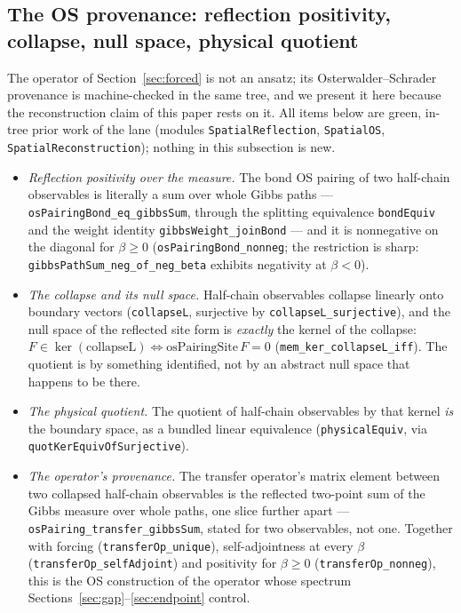 \documentclass[11pt]{article}
\newcommand{\lean}[1]{\texttt{#1}}
\begin{document}
\subsection{The OS provenance: reflection positivity, collapse, null
space, physical quotient}\label{sec:provenance}
The operator of Section~\ref{sec:forced} is not an ansatz; its
Osterwalder--Schrader provenance is machine-checked in the same tree,
and we present it here because the reconstruction claim of this paper
rests on it.  All items below are green, in-tree prior work of the
lane (modules \lean{SpatialReflection}, \lean{SpatialOS},
\lean{SpatialReconstruction}); nothing in this subsection is new.

\begin{itemize}
\item \emph{Reflection positivity over the measure.}  The bond OS
pairing of two half-chain observables is literally a sum over whole
Gibbs paths --- \lean{osPairingBond\_eq\_gibbsSum}, through the
splitting equivalence \lean{bondEquiv} and the weight identity
\lean{gibbsWeight\_joinBond} --- and it is nonnegative on the diagonal
for $\beta \ge 0$ (\lean{osPairingBond\_nonneg}; the restriction is
sharp: \lean{gibbsPathSum\_neg\_of\_neg\_beta} exhibits negativity at
$\beta < 0$).
\item \emph{The collapse and its null space.}  Half-chain observables
collapse linearly onto boundary vectors (\lean{collapseL},
surjective by \lean{collapseL\_surjective}), and the null space of the
reflected site form is \emph{exactly} the kernel of the collapse:
$F \in \ker(\mathrm{collapseL}) \iff
\mathrm{osPairingSite}\,F = 0$ (\lean{mem\_ker\_collapseL\_iff}).
The quotient is by something identified, not by an abstract null
space that happens to be there.
\item \emph{The physical quotient.}  The quotient of half-chain
observables by that kernel \emph{is} the boundary space, as a bundled
linear equivalence (\lean{physicalEquiv}, via
\lean{quotKerEquivOfSurjective}).
\item \emph{The operator's provenance.}  The transfer operator's
matrix element between two collapsed half-chain observables is the
reflected two-point sum of the Gibbs measure over whole paths, one
slice further apart --- \lean{osPairing\_transfer\_gibbsSum}, stated
for two observables, not one.  Together with forcing
(\lean{transferOp\_unique}), self-adjointness at every $\beta$
(\lean{transferOp\_selfAdjoint}) and positivity for $\beta \ge 0$
(\lean{transferOp\_nonneg}), this is the OS construction of the
operator whose spectrum Sections~\ref{sec:gap}--\ref{sec:endpoint}
control.
\end{itemize}
\end{document}
